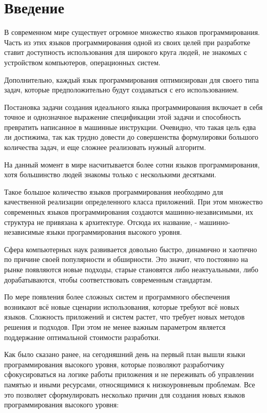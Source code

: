 \documentclass{mipt-thesis-bs}
\begin{document}
\mainmatter


\chapter{Введение}

В современном мире существует огромное множество языков программирования.
Часть из этих языков программирования одной из своих целей при разработке
ставит доступность использования для широкого круга людей, не
знакомых с устройством компьютеров, операционных систем.

Дополнительно, каждый язык программирования оптимизирован для своего типа
задач, которые предположительно будут создаваться с его использованием.

Постановка задачи создания идеального языка программирования включает в себя
точное и однозначное выражение спецификации этой задачи и способность превратить
написанное в машинные инструкции. Очевидно, что такая цель едва ли достижима,
так как трудно довести до совершенства формулировки большого количества задач,
и еще сложнее реализовать нужный алгоритм.

На данный момент в мире насчитывается более сотни языков программирования,
хотя большинство людей знакомы только с несколькими десятками.

Такое большое количество языков программирования необходимо для качественной
реализации определенного класса приложений. При этом множество современных
языков программирования создаются машинно-независимыми, их структура
не привязана к архитектуре. Отсюда их название, - машинно-независимые языки
программирования высокого уровня.

Сфера компьютерных наук развивается довольно быстро, динамично и хаотично
по причине своей популярности и обширности. Это значит, что постоянно
на рынке появляются новые подходы, старые становятся либо неактуальными, либо
дорабатываются, чтобы соответствовать современным стандартам.

По мере появления более сложных систем и программного обеспечения возникают
всё новые сценарии использования, которые требуют всё новых языков. Сложность
приложений и систем растет, что требует новых методов решения и подходов. При
этом не менее важным параметром является поддержание оптимальной стоимости
разработки.

Как было сказано ранее, на сегодняшний день на первый план вышли языки
программирования высокого уровня, которые позволяют разработчику
сфокусироваться на логике работы приложения и не переживать об
управлении памятью и иными ресурсами, относящимися к низкоуровневым проблемам.
Все это позволяет сформулировать несколько причин для создания
новых языков программирования высокого уровня:
\end{document}
